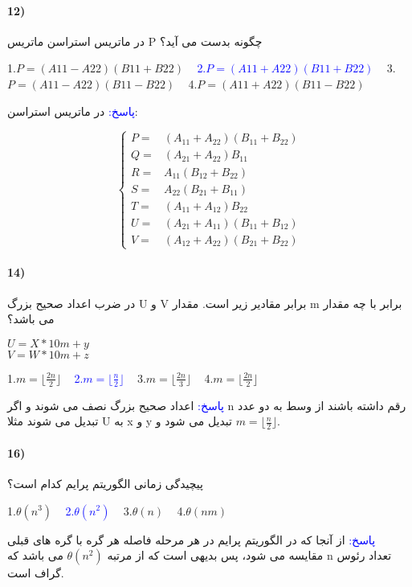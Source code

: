 \documentclass[10pt,a4paper]{article}
\begin{document}
	\paragraph{12)} در ماتریس استراسن ماتریس P چگونه بدست می آید؟
	\begin{flushright} 
		1.$P=(A11 - A22)(B11 + B22)$\,\,\,\,\, \textcolor{blue}{2.$P=(A11 + A22)(B11 + B22)$}\,\,\,\,\, 3.$P=(A11 - A22)(B11 - B22)$\,\,\,\,\, 4.$P=(A11 + A22)(B11 - B22)$
	\end{flushright}
	\begin{flushright} 
		\textcolor{blue}{پاسخ:}
	در ماتریس استراسن:
		\begin{latin}
		$$
			\begin{cases}
				P= & (A_{11}+A_{22})(B_{11}+B_{22}) \\
				Q= & (A_{21}+A_{22})B_{11} \\
				R= &  A_{11}(B_{12}+B_{22}) \\
				S= &  A_{22}(B_{21}+B_{11}) \\
				T= &  (A_{11}+A_{12})B_{22} \\
				U= &  (A_{21}+A_{11})(B_{11}+B_{12}) \\
				V= &  (A_{12}+A_{22})(B_{21}+B_{22})
			\end{cases}
		$$
		\end{latin}
	\end{flushright}

	\paragraph{14)} در ضرب اعداد صحیح بزرگ U و V برابر مقادیر زیر است. مقدار m برابر با چه مقدار می باشد؟
	\begin{flushleft}                           
		$U = X*10m + y$\\
		$V = W*10m + z$
	\end{flushleft}
	\begin{flushright} 
		1.$m=\lfloor\frac{2n}{2}\rfloor$\,\,\,\,\, \textcolor{blue}{2.$m=\lfloor\frac{n}{2}\rfloor$}\,\,\,\,\, 3.$m=\lfloor\frac{2n}{3}\rfloor$\,\,\,\,\, 4.$m=\lfloor\frac{2n}{2}\rfloor$
	\end{flushright}
	\begin{flushright} 
		\textcolor{blue}{پاسخ:}
	اعداد صحیح بزرگ نصف می شوند و اگر n رقم داشته باشند از وسط به دو عدد تبدیل می شوند مثلا U به x و y تبدیل می شود و $m=\lfloor\frac{n}{2}\rfloor$.
	\end{flushright}

	\paragraph{16)} پیچیدگی زمانی الگوریتم پرایم کدام است؟
	\begin{flushright} 
		1.$\theta(n^3)$\,\,\,\,\, \textcolor{blue}{2.$\theta(n^2)$}\,\,\,\,\, 3.$\theta(n)$\,\,\,\,\, 4.$\theta(nm)$
	\end{flushright}
	\begin{flushright} 
		\textcolor{blue}{پاسخ:}
	از آنجا که در الگوریتم پرایم در هر مرحله فاصله هر گره با گره های قبلی مقایسه می شود، پس بدیهی است که از مرتبه $\theta(n^2)$ می باشد که n تعداد رئوس گراف است.
	\end{flushright}
\end{document}
